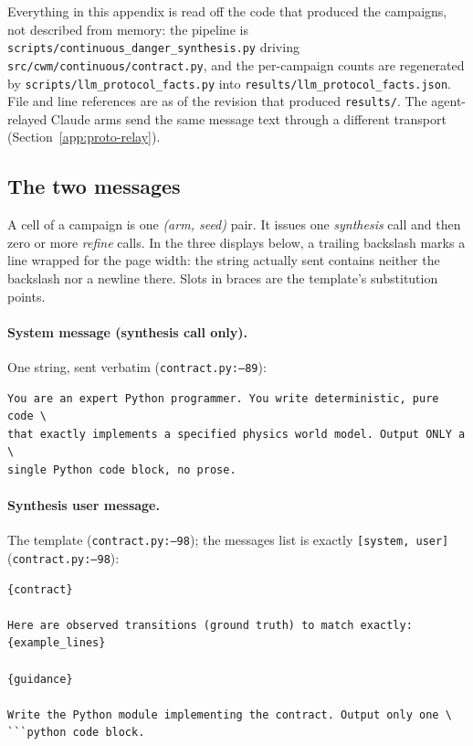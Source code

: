 Everything in this appendix is read off the code that produced the campaigns, not
described from memory: the pipeline is
\texttt{scripts/\allowbreak continuous\_\allowbreak danger\_\allowbreak synthesis.\allowbreak py} driving
\texttt{src/\allowbreak cwm/\allowbreak continuous/\allowbreak contract.\allowbreak py}, and the per-campaign counts are
regenerated by \texttt{scripts/\allowbreak llm\_\allowbreak protocol\_\allowbreak facts.\allowbreak py} into
\texttt{results/\allowbreak llm\_\allowbreak protocol\_\allowbreak facts.\allowbreak json}. File and line references are as of
the revision that produced \texttt{results/}. The agent-relayed Claude arms send
the same message text through a different transport
(Section~\ref{app:proto-relay}).

\subsection{The two messages}
\label{app:proto-messages}

A cell of a campaign is one \emph{(arm, seed)} pair. It issues one
\emph{synthesis} call and then zero or more \emph{refine} calls. In the three
displays below, a trailing backslash marks a line wrapped for the page width:
the string actually sent contains neither the backslash nor a newline there.
Slots in braces are the template's substitution points.

\paragraph{System message (synthesis call only).} One string, sent verbatim
(\texttt{contract.\allowbreak py:--89}):

{\small
\begin{verbatim}
You are an expert Python programmer. You write deterministic, pure code \
that exactly implements a specified physics world model. Output ONLY a \
single Python code block, no prose.
\end{verbatim}
}

\paragraph{Synthesis user message.} The template (\texttt{contract.\allowbreak py:--98});
the messages list is exactly \texttt{[system, user]} (\texttt{contract.\allowbreak py:--98}):

{\small
\begin{verbatim}
{contract}

Here are observed transitions (ground truth) to match exactly:
{example_lines}

{guidance}

Write the Python module implementing the contract. Output only one \
```python code block.
\end{verbatim}
}

